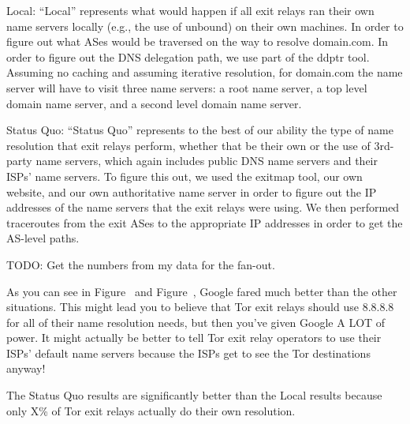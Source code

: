 Local: ``Local'' represents what would happen if all exit relays ran their own name 
servers locally (e.g., the use of unbound) on their own machines. In order to figure out 
what ASes would be traversed on the way to resolve domain.com. In order to figure out the 
DNS delegation path, we use part of the ddptr tool. Assuming no caching and assuming 
iterative resolution, for domain.com the name server will have to visit three name servers:
a root name server, a top level domain name server, and a second level domain name server. 

Status Quo: ``Status Quo'' represents to the best of our ability the type of name resolution 
that exit relays perform, whether that be their own or the use of 3rd-party name servers, 
which again includes public DNS name servers and their ISPs' name servers. To figure this 
out, we used the exitmap tool, our own website, and our own authoritative name server 
in order to figure out the IP addresses of the name servers that the exit relays were 
using. We then performed traceroutes from the exit ASes to the appropriate IP addresses 
in order to get the AS-level paths.

TODO: Get the numbers from my data for the fan-out.

As you can see in Figure~ and
Figure~, 
Google fared much better than the other situations. This might lead you to believe that 
Tor exit relays should use 8.8.8.8 for all of their name resolution needs, but then you've 
given Google A LOT of power. It might actually be better to tell Tor exit relay operators 
to use their ISPs' default name servers because the ISPs get to see the Tor destinations 
anyway!

The Status Quo results are significantly better than the Local results because only X\% 
of Tor exit relays actually do their own resolution.

